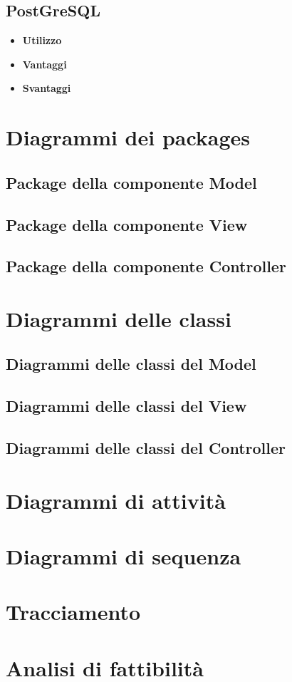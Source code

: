 \documentclass[a4paper,11pt]{article}
\begin{document}
	\subsection{PostGreSQL}
	\begin{itemize}
		\item\textbf{Utilizzo}
		\item\textbf{Vantaggi}
		\item\textbf{Svantaggi}
	\end{itemize}
	
	\section{Diagrammi dei packages}
	\subsection{Package della componente Model}
	\subsection{Package della componente View}
	\subsection{Package della componente Controller}
			
	\section{Diagrammi delle classi}
		\subsection{Diagrammi delle classi del Model}
		\subsection{Diagrammi delle classi del View}
		\subsection{Diagrammi delle classi del Controller}
	\section{Diagrammi di attività}
	\section{Diagrammi di sequenza}
	\section{Tracciamento}
	\section{Analisi di fattibilità}
\end{document}
